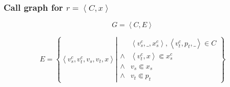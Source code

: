\begin{frame}

\frametitle{Call graph for $r=\left\langle C,x\right\rangle$}

\begin{center}

$$G=\left\langle C,E\right\rangle$$

$$E = \left\{ \left\langle v^c_s,v^c_t,v_s,v_t,x \right\rangle \left|
\begin{array}{ll}
&\left\langle v^c_s, \_, x^c_s \right\rangle, \left\langle v^c_t, p_t, \_
\right\rangle \in C\\
\wedge & \left\langle v^c_t, x \right\rangle\Subset x^c_s\\
\wedge & v_s \Subset x_s\\
\wedge & v_t \Subset p_t
\end{array}\right.\right\}$$

\end{center}


\end{frame}
